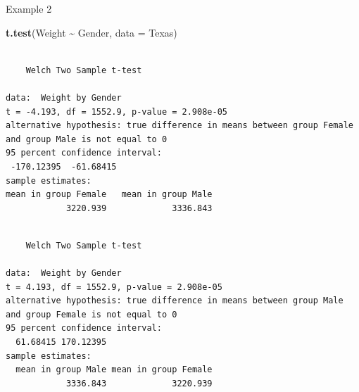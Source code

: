 \documentclass[
  ignorenonframetext,
]{beamer}
\newenvironment{Shaded}{\begin{snugshade}}{\end{snugshade}}
\newcommand{\AttributeTok}[1]{\textcolor[rgb]{0.13,0.29,0.53}{#1}}
\newcommand{\FunctionTok}[1]{\textcolor[rgb]{0.13,0.29,0.53}{\textbf{#1}}}
\newcommand{\NormalTok}[1]{#1}
\newcommand{\OtherTok}[1]{\textcolor[rgb]{0.56,0.35,0.01}{#1}}
\newcommand{\SpecialCharTok}[1]{\textcolor[rgb]{0.81,0.36,0.00}{\textbf{#1}}}
\newcommand{\StringTok}[1]{\textcolor[rgb]{0.31,0.60,0.02}{#1}}
\begin{document}
\begin{frame}[fragile]{Example 2}
\label{example-2-3}
\tiny

\begin{Shaded}
\begin{Highlighting}[]
\FunctionTok{t.test}\NormalTok{(Weight }\SpecialCharTok{\textasciitilde{}}\NormalTok{ Gender, }\AttributeTok{data =}\NormalTok{ Texas)}
\end{Highlighting}
\end{Shaded}

\begin{verbatim}

    Welch Two Sample t-test

data:  Weight by Gender
t = -4.193, df = 1552.9, p-value = 2.908e-05
alternative hypothesis: true difference in means between group Female and group Male is not equal to 0
95 percent confidence interval:
 -170.12395  -61.68415
sample estimates:
mean in group Female   mean in group Male 
            3220.939             3336.843 
\end{verbatim}

\begin{Shaded}
\end{Shaded}

\begin{verbatim}

    Welch Two Sample t-test

data:  Weight by Gender
t = 4.193, df = 1552.9, p-value = 2.908e-05
alternative hypothesis: true difference in means between group Male and group Female is not equal to 0
95 percent confidence interval:
  61.68415 170.12395
sample estimates:
  mean in group Male mean in group Female 
            3336.843             3220.939 
\end{verbatim}

\normalsize
\end{frame}
\end{document}
